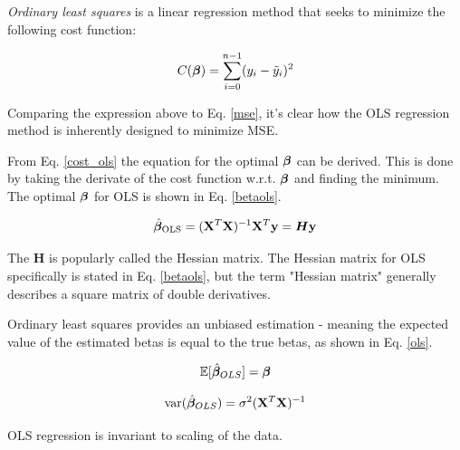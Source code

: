 \textit{Ordinary least squares} is a linear regression method that seeks to minimize the following cost function:

\begin{equation}\label{cost_ols}
    C(\boldsymbol{\beta}) = \sum_{i=0}^{n-1}(y_i-\Tilde{y}_i)^2
\end{equation}

Comparing the expression above to Eq. \ref{mse}, it's clear how the OLS regression method is inherently designed to minimize MSE.

From Eq. \ref{cost_ols} the equation for the optimal $\boldsymbol{\beta}$ can be derived. This is done by taking the derivate of the cost function w.r.t. $\boldsymbol{\beta}$ and finding the minimum. The optimal $\boldsymbol{\beta}$ for OLS is shown in Eq. \ref{betaols}. 

\begin{equation}\label{betaols}
    \hat{\boldsymbol{\beta}}_{\text{OLS}} = (\mathbf{X}^T\mathbf{X})^{-1}\mathbf{X}^T\mathbf{y} = \boldsymbol{H}\mathbf{y}
\end{equation}

The $\boldsymbol{H}$ is popularly called the Hessian matrix. The Hessian matrix for OLS specifically is stated in Eq. \ref{betaols}, but the term "Hessian matrix" generally describes a square matrix of double derivatives.


Ordinary least squares provides an unbiased estimation - meaning the expected value of the estimated betas is equal to the true betas, as shown in Eq. \ref{ols}.  

\begin{equation}\label{ols}
    \mathbb{E}[\hat{\boldsymbol{\beta}}_{OLS}] = \boldsymbol{\beta}
\end{equation}

\begin{equation}
   \text{var}(\hat{\boldsymbol{\beta}}_{OLS}) = \sigma^2 (\mathbf{X}^T\mathbf{X})^{-1}
\end{equation}

OLS regression is invariant to scaling of the data.


